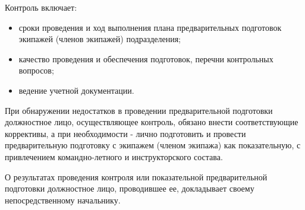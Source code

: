 Контроль включает:
\begin{itemize}
    \item сроки проведения и ход выполнения плана предварительных подготовок экипажей (членов экипажей) подразделения;
    \item качество проведения и обеспечения подготовок, перечни контрольных вопросов;
    \item ведение учетной документации.
\end{itemize}

При обнаружении недостатков в проведении предварительной подготовки должностное лицо, осуществляющее контроль, обязано внести соответствующие коррективы, а при необходимости - лично подготовить и провести предварительную подготовку с экипажем (членом экипажа) как показательную, с привлечением командно-летного и инструкторского состава.

О результатах проведения контроля или показательной предварительной подготовки должностное лицо, проводившее ее, докладывает своему непосредственному начальнику.